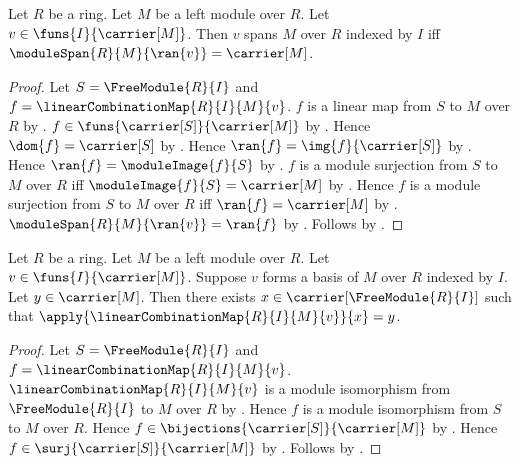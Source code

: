 \begin{theorem}\label{indexed_module_spanning_iff_span_full}
    Let $R$ be a ring.
    Let $M$ be a left module over $R$.
    Let $v\in\funs{I}{\carrier[M]}$.
    Then $v$ spans $M$ over $R$ indexed by $I$ iff
        $\moduleSpan{R}{M}{\ran{v}}=\carrier[M]$.
\end{theorem}
\begin{proof}
    Let $S=\FreeModule{R}{I}$ and
        $f=\linearCombinationMap{R}{I}{M}{v}$.
    $f$ is a linear map from $S$ to $M$ over $R$ by
        .
    $f\in\funs{\carrier[S]}{\carrier[M]}$ by
        .
    Hence $\dom{f}=\carrier[S]$ by .
    Hence $\ran{f}=\img{f}{\carrier[S]}$ by .
    Hence $\ran{f}=\moduleImage{f}{S}$ by
        .
    $f$ is a module surjection from $S$ to $M$ over $R$ iff
        $\moduleImage{f}{S}=\carrier[M]$ by
        .
    Hence $f$ is a module surjection from $S$ to $M$ over $R$ iff
        $\ran{f}=\carrier[M]$ by \auto.
    $\moduleSpan{R}{M}{\ran{v}}=\ran{f}$ by
        .
    Follows by .
\end{proof}

\begin{theorem}\label{indexed_module_basis_coordinate_existence}
    Let $R$ be a ring.
    Let $M$ be a left module over $R$.
    Let $v\in\funs{I}{\carrier[M]}$.
    Suppose $v$ forms a basis of $M$ over $R$ indexed by $I$.
    Let $y\in\carrier[M]$.
    Then there exists $x\in\carrier[\FreeModule{R}{I}]$ such that
        $\apply{\linearCombinationMap{R}{I}{M}{v}}{x}=y$.
\end{theorem}
\begin{proof}
    Let $S=\FreeModule{R}{I}$ and
        $f=\linearCombinationMap{R}{I}{M}{v}$.
    $\linearCombinationMap{R}{I}{M}{v}$ is a module isomorphism from
        $\FreeModule{R}{I}$ to $M$ over $R$ by
        .
    Hence $f$ is a module isomorphism from $S$ to $M$ over $R$.
    Hence $f\in\bijections{\carrier[S]}{\carrier[M]}$ by
        .
    Hence $f\in\surj{\carrier[S]}{\carrier[M]}$ by
        .
    Follows by .
\end{proof}

